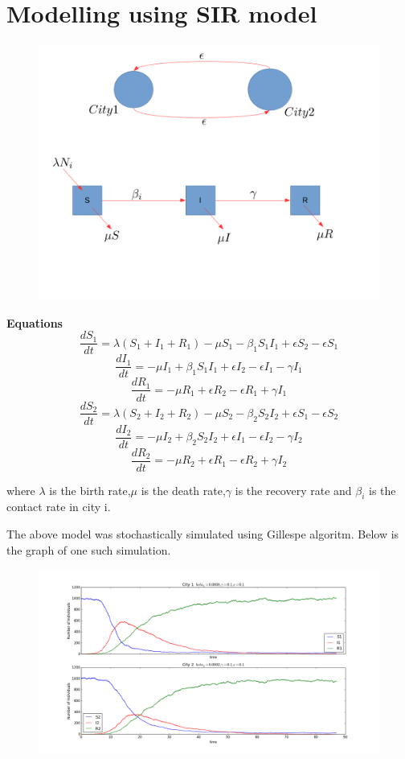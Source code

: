 \documentclass{article}
\begin{document}
\section{Modelling using SIR model}
\begin{figure}[h]
  \centering
\includegraphics[scale=0.35]{sir_im}
\end{figure}
\textbf{Equations} \newline
$$\frac{dS_{1}}{dt}=\lambda(S_{1}+I_{1}+R_{1}) -\mu  S_{1} - \beta_{1} S_{1}I_{1}  + \epsilon S_{2} -\epsilon S_{1} $$  
$$\frac{dI_{1}}{dt}= -\mu  I_{1} + \beta_{1} S_{1}I_{1}  + \epsilon I_{2} -\epsilon I_{1} -\gamma I_{1} $$ 
$$\frac{dR_{1}}{dt}= -\mu  R_{1} +  \epsilon R_{2} -\epsilon R_{1} +\gamma I_{1} $$ 
$$\frac{dS_{2}}{dt}=\lambda(S_{2}+I_{2}+R_{2}) -\mu  S_{2} - \beta_{2} S_{2}I_{2}  + \epsilon S_{1} -\epsilon S_{2} $$  
$$\frac{dI_{2}}{dt}= -\mu  I_{2} + \beta_{2} S_{2}I_{2}  + \epsilon I_{1} -\epsilon I_{2} -\gamma I_{2} $$ 
$$\frac{dR_{2}}{dt}= -\mu  R_{2} +  \epsilon R_{1} -\epsilon R_{2} +\gamma I_{2} $$ 

where $\lambda$ is the birth rate,$\mu$ is the death rate,$\gamma$ is
the recovery rate and $\beta_{i}$ is the contact rate in city i. \newline

The above model was stochastically simulated using Gillespe
algoritm. Below is the graph of one such simulation.
\begin{figure}[h]
  \centering
\includegraphics[width=\textwidth]{Stochstic_sim}
\end{figure}
\end{document}
